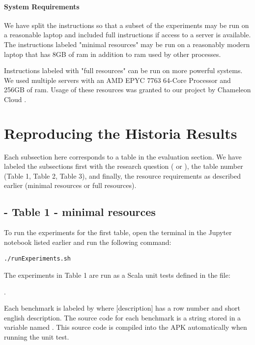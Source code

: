 \documentclass{acmart} %
\begin{document}
\paragraph{System Requirements} 
We have split the instructions so that a subset of the experiments may be run on a reasonable laptop and included full instructions if access to a server is available.
The instructions labeled "minimal resources" may be run on a reasonably modern laptop that has 8GB of ram in addition to ram used by other processes. 

Instructions labeled with "full resources" can be run on more powerful systems.  We used multiple servers with an AMD EPYC 7763 64-Core Processor and 256GB of ram.  Usage of these resources was granted to our project by Chameleon Cloud \cite{keahey2020lessons}.


\section{Reproducing the Historia Results}

Each subsection here corresponds to a table in the evaluation section.  We have labeled the subsections first with the research question ( or ), the table number (Table 1, Table 2, Table 3), and finally, the resource requirements as described earlier (minimal resources or full resources).

\subsection{ - Table 1 - minimal resources}

To run the experiments for the first table, open the terminal in the Jupyter notebook listed earlier and run the following command:
\begin{lstlisting}[language=bash]
    ./runExperiments.sh
\end{lstlisting}

The experiments in Table 1 are run as a Scala unit tests defined in the file: 

.  

Each benchmark is labeled by  where [description] has a row number and short english description.
The source code for each benchmark is a string stored in a variable named .
This source code is compiled into the APK automatically when running the unit test.
\end{document}
